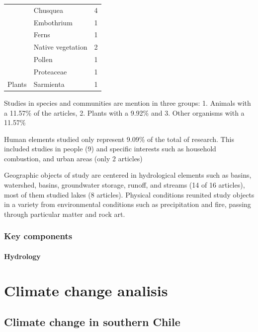 \documentclass[]{article}
\let\oldparagraph\paragraph
\renewcommand{\paragraph}[1]{\oldparagraph{#1}\mbox{}}
\begin{document}
\begin{table}
\begin{tabular}[t]{lll}
 & Chusquea & 4\\

 & Embothrium & 1\\

 & Ferns & 1\\

 & Native vegetation & 2\\

 & Pollen & 1\\

 & Proteaceae & 1\\

\multirow{-8}{*}{\raggedright\arraybackslash Plants} & Sarmienta & 1\\
\bottomrule
\end{tabular}
\end{table}

Studies in species and communities are mention in three groups: 1. Animals with a 11.57\% of the articles, 2. Plants with a 9.92\% and 3. Other organisms with a 11.57\%

Human elements studied only represent 9.09\% of the total of research. This included studies in people (9) and specific interests such as household combustion, and urban areas (only 2 articles)

Geographic objects of study are centered in hydrological elements such as basins, watershed, basins, groundwater storage, runoff, and streams (14 of 16 articles), most of them studied lakes (8 articles).
Physical conditions reunited study objects in a variety from environmental conditions such as precipitation and fire, passing through particular matter and rock art.

\hypertarget{key-components}{%
\subsubsection{Key components}\label{key-components}}

\hypertarget{hydrology}{%
\paragraph{Hydrology}\label{hydrology}}

\hypertarget{climate-change-analisis}{%
\section{Climate change analisis}\label{climate-change-analisis}}

\hypertarget{climate-change-in-southern-chile}{%
\subsection{Climate change in southern Chile}\label{climate-change-in-southern-chile}}
\end{document}
